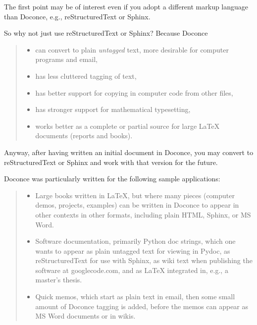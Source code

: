 \documentclass[a4paper,english]{article}
\begin{document}
The first point may be of interest even if you adopt a different
markup language than Doconce, e.g., reStructuredText or Sphinx.

So why not just use reStructuredText or Sphinx? Because Doconce
%
\begin{quote}
%
\begin{itemize}

\item can convert to plain \emph{untagged} text,
more desirable for computer programs and email,

\item has less cluttered tagging of text,

\item has better support for copying in computer code from other files,

\item has stronger support for mathematical typesetting,

\item works better as a complete or partial source for large LaTeX
documents (reports and books).

\end{itemize}

\end{quote}

Anyway, after having written an initial document in Doconce, you may
convert to reStructuredText or Sphinx and work with that version for
the future.

Doconce was particularly written for the following sample applications:
%
\begin{quote}
%
\begin{itemize}

\item Large books written in LaTeX, but where many pieces (computer demos,
projects, examples) can be written in Doconce to appear in other
contexts in other formats, including plain HTML, Sphinx, or MS Word.

\item Software documentation, primarily Python doc strings, which one wants
to appear as plain untagged text for viewing in Pydoc, as reStructuredText
for use with Sphinx, as wiki text when publishing the software at
googlecode.com, and as LaTeX integrated in, e.g., a master's thesis.

\item Quick memos, which start as plain text in email, then some small
amount of Doconce tagging is added, before the memos can appear as
MS Word documents or in wikis.

\end{itemize}

\end{quote}
\end{document}
